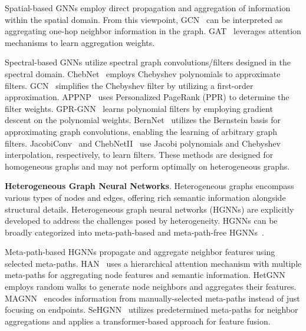 \documentclass{article}
\begin{document}
Spatial-based GNNs employ direct propagation and aggregation of information within the spatial domain. From this viewpoint, GCN~\cite{gcn} can be interpreted as aggregating one-hop neighbor information in the graph. GAT~\cite{gat} leverages attention mechanisms to learn aggregation weights. 


Spectral-based GNNs utilize spectral graph convolutions/filters designed in the spectral domain. ChebNet~\cite{Chebnet} employs Chebyshev polynomials to approximate filters. GCN~\cite{gcn} simplifies the Chebyshev filter by utilizing a first-order approximation. APPNP~\cite{appnp} uses Personalized PageRank (PPR) to determine the filter weights.  GPR-GNN~\cite{gprgnn} learns polynomial filters by employing gradient descent on the polynomial weights. BernNet~\cite{bernnet} utilizes the Bernstein basis for approximating graph convolutions, enabling the learning of arbitrary graph filters.
JacobiConv~\cite{jacobi} and ChebNetII~\cite{chebnetii} use Jacobi polynomials and Chebyshev interpolation, respectively, to learn filters. These methods are designed for homogeneous graphs and may not perform optimally on heterogeneous graphs.

\textbf{Heterogeneous Graph Neural Networks}. 
Heterogeneous graphs encompass various types of nodes and edges, offering rich semantic information alongside structural details. Heterogeneous graph neural networks (HGNNs) are explicitly developed to address the challenges posed by heterogeneity. HGNNs can be broadly categorized into meta-path-based and meta-path-free HGNNs~\cite{sehgnn}. 

Meta-path-based HGNNs propagate and aggregate neighbor features using selected meta-paths. HAN~\cite{han} uses a hierarchical attention mechanism with multiple meta-paths for aggregating node features and semantic information. HetGNN~\cite{hetgnn} employs random walks to generate node neighbors and aggregates their features. MAGNN~\cite{magnn} encodes information from manually-selected meta-paths instead of just focusing on endpoints. SeHGNN~\cite{sehgnn} utilizes predetermined meta-paths for neighbor aggregations and applies a transformer-based approach for feature fusion. 
\end{document}
